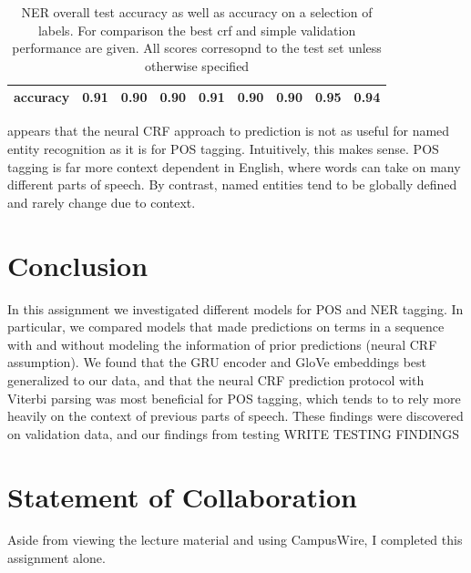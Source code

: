 \documentclass[11pt,a4paper]{article}
\begin{document}
\begin{table}[h]
\begin{tabular}{lrrrrrrrr}
accuracy     &            0.91 &               0.90 &                 0.90 &              0.91 &                 0.90 &                   0.90 &           0.95 &             0.94 \\
\bottomrule
\end{tabular}
\caption{NER overall test accuracy as well as accuracy on a selection of labels. For comparison the best crf and simple validation performance are given. All scores corresopnd to the test set 
unless otherwise specified}
\end{table}



appears that the neural CRF approach to prediction is not as useful for named entity recognition as it is for POS tagging. Intuitively, this makes sense. POS tagging is far more context dependent in English, where words can take on many different parts of speech. By contrast, named entities tend to be globally defined and rarely change due to context.

\section{Conclusion}%
\label{sec:conclusion}

In this assignment we investigated different models for POS and NER tagging. In particular, we compared models that made predictions on terms in a sequence with and without modeling the information of prior predictions (neural CRF assumption). We found that the GRU encoder and GloVe embeddings best generalized to our data, and that the neural CRF prediction protocol with Viterbi parsing was most beneficial for POS tagging, which tends to to rely more heavily on the context of previous parts of speech. These findings were discovered on validation data, and our findings from testing WRITE TESTING FINDINGS



\section{Statement of Collaboration}

Aside from viewing the lecture material and using CampusWire, I 
completed this assignment alone.






\appendix
\end{document}
